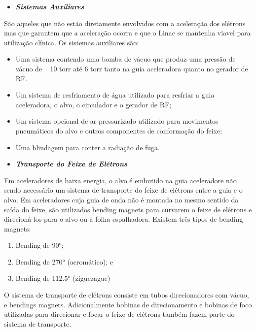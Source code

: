 \documentclass[11pt,a4paper]{article}
\begin{document}
                \begin{itemize}
                    \item \textbf{\textit{\textcolor{CarnationPink}{Sistemas Auxiliares}}}
                \end{itemize}

    São aqueles que não estão diretamente envolvidos com a aceleração dos elétrons mas que garantem que a aceleração ocorra e que o Linac se mantenha viavel para utilização clínica. Os sistemas auxiliares são:

    \begin{itemize}
		\item Uma sistema contendo uma bomba de vácuo que produz uma pressão de vácuo de ~ 10 torr até 6 torr tanto na guia aceleradora quanto no gerador de RF.
		\item Um sistema de resfriamento de água utilizado para resfriar a guia aceleradora, o alvo, o circulador e o gerador de RF;
		\item Um sistema opcional de ar pressurizado utilizado para movimentos pneumáticos do alvo e outros componentes de conformação do feixe;
		\item Uma blindagem para conter a radiação de fuga.
	\end{itemize}                

                \begin{itemize}
                    \item \textbf{\textit{\textcolor{CarnationPink}{Transporte do Feixe de Elétrons}}}
                \end{itemize}

    Em aceleradores de baixa energia, o alvo é embutido na guia aceleradore não sendo necessário um sistema de transporte do feixe de elétrons entre a guia e o alvo. Em aceleradores cuja guia de onda não é montada no mesmo sentido da saída do feixe, são utilizados bending magnets para curvarem o feixe de elétrons e direcioná-los para o alvo ou à folha espalhadora. Existem três tipos de bending magnets: 
                    
    \begin{enumerate}
		\item Bending de \ang{90};
		\item Bending de \ang{270} (acromático); e
		\item Bending de \ang{112.5} (ziguezague)
	\end{enumerate}                   

    O sistema de transporte de elétrons consiste em tubos direcionadores com vácuo, e bendings magnets. Adicionalmente bobinas de direcionamento e bobinas de foco utilizadas para direcionar e focar o feixe de elétrons também fazem parte do sistema de transporte. 
\end{document}
